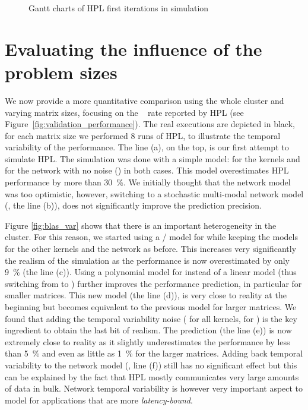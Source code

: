 \begin{figure}[htpb]
\begin{tabular}{c@{}c}
            \end{tabular}
            \caption{Gantt charts of HPL first iterations in simulation}\vspace{-1em}
            \label{fig:gantt_simulation}
        \end{figure}

    \section{Evaluating the influence of the problem sizes}%
    \label{sec:different_problem_sizes}

        We now provide a more quantitative comparison using the whole cluster and varying matrix sizes, focusing on the
        \si{\giga\flops} rate reported by HPL (see Figure~\ref{fig:validation_performance}).  The real executions are
        depicted in black, for each matrix size we performed 8 runs of HPL, to illustrate the temporal variability of
        the performance.  The line (a), on the top, is our first attempt to simulate HPL. The simulation was done with a
        simple model:  for the kernels and  for the network with no noise () in both cases.
        This model overestimates HPL performance by more than \SI{30}{\percent}. We initially thought that the network
        model was too optimistic, however, switching to a stochastic multi-modal network model (, the line
        (b)), does not significantly improve the prediction precision.

        Figure \ref{fig:blas_var} shows that there is an important heterogeneity in the cluster. For this reason, we
        started using a / model for \dgemm while keeping the models for the other kernels and the
        network as before. This increases very significantly the realism of the simulation as the performance is now
        overestimated by only \SI{9}{\percent} (the line (c)).  Using a polynomial model for \dgemm instead of a linear
        model (thus switching from  to ) further improves the performance prediction, in
        particular for smaller matrices.  This new model (the line (d)), is very close to reality at the beginning but
        becomes equivalent to the previous model for larger matrices.  We found that adding the temporal variability
        noise ( for all kernels,  for \dgemm) is the key ingredient to obtain the last bit of
        realism. The prediction (the line (e)) is now extremely close to reality as it slightly underestimates the
        performance by less than \SI{5}{\percent} and even as little as \SI{1}{\percent} for the larger matrices. Adding
        back temporal variability to the network model (, line (f)) still has no significant effect but this
        can be explained by the fact that HPL mostly communicates very large amounts of data in bulk. Network temporal
        variability is however very important aspect to model for applications that are more \emph{latency-bound}.

